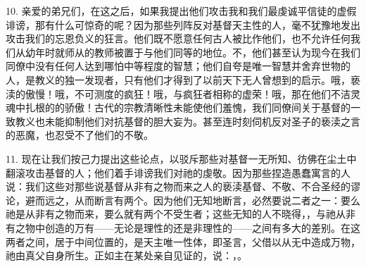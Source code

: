 10. 亲爱的弟兄们，在这之后，如果我提出他们攻击我和我们最虔诚平信徒的虚假诽谤，那有什么可惊奇的呢？因为那些列阵反对基督天主性的人，毫不犹豫地发出攻击我们的忘恩负义的狂言。他们既不愿意任何古人被比作他们，也不允许任何我们从幼年时就师从的教师被置于与他们同等的地位。不，他们甚至认为现今在我们同僚中没有任何人达到哪怕中等程度的智慧；他们自夸是唯一智慧并舍弃世物的人，是教义的独一发现者，只有他们才得到了以前天下无人曾想到的启示。哦，亵渎的傲慢！哦，不可测度的疯狂！哦，与疯狂者相称的虚荣！哦，那在他们不洁灵魂中扎根的的骄傲！古代的宗教清晰性未能使他们羞愧，我们同僚间关于基督的一致教义也未能抑制他们对抗基督的胆大妄为。甚至连时刻伺机反对圣子的亵渎之言的恶魔，也忍受不了他们的不敬。\par

11. 现在让我们按己力提出这些论点，以驳斥那些对基督一无所知、彷佛在尘土中翻滚攻击基督的人；他们着手诽谤我们对祂的虔敬。因为那些捏造愚蠢寓言的人说：我们这些对那些说基督从非有之物而来之人的亵渎基督、不敬、不合圣经的谬论，避而远之，从而断言有两个。因为他们无知地断言，必然要说二者之一：要么祂是从非有之物而来，要么就有两个不受生者；这些无知的人不晓得，，与祂从非有之物中创造的万有——无论是理性的还是非理性的——之间有多大的差别。在这两者之间，居于中间位置的，是天主唯一性体，即圣言，父借以从无中造成万物，祂由真父自身所生。正如主在某处亲自见证的，说：，。\par

